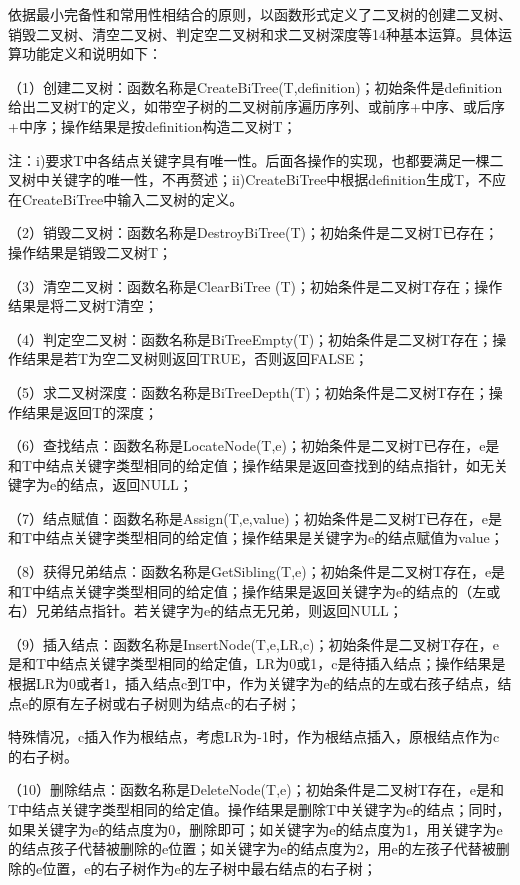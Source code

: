 \documentclass[supercite]{Experimental_Report}
\theoremstyle{definition}
\begin{document}
依据最小完备性和常用性相结合的原则，以函数形式定义了二叉树的创建二叉树、销毁二叉树、清空二叉树、判定空二叉树和求二叉树深度等14种基本运算。具体运算功能定义和说明如下：

（1）创建二叉树：函数名称是CreateBiTree(T,definition)；初始条件是definition 给出二叉树T的定义，如带空子树的二叉树前序遍历序列、或前序+中序、或后序+中序；操作结果是按definition构造二叉树T；

注：i)要求T中各结点关键字具有唯一性。后面各操作的实现，也都要满足一棵二叉树中关键字的唯一性，不再赘述；ii)CreateBiTree中根据definition生成T，不应在CreateBiTree中输入二叉树的定义。

（2）销毁二叉树：函数名称是DestroyBiTree(T)；初始条件是二叉树T已存在；操作结果是销毁二叉树T；

（3）清空二叉树：函数名称是ClearBiTree (T)；初始条件是二叉树T存在；操作结果是将二叉树T清空；

（4）判定空二叉树：函数名称是BiTreeEmpty(T)；初始条件是二叉树T存在；操作结果是若T为空二叉树则返回TRUE，否则返回FALSE；

（5）求二叉树深度：函数名称是BiTreeDepth(T)；初始条件是二叉树T存在；操作结果是返回T的深度；

（6）查找结点：函数名称是LocateNode(T,e)；初始条件是二叉树T已存在，e是和T中结点关键字类型相同的给定值；操作结果是返回查找到的结点指针，如无关键字为e的结点，返回NULL；

（7）结点赋值：函数名称是Assign(T,e,value)；初始条件是二叉树T已存在，e是和T中结点关键字类型相同的给定值；操作结果是关键字为e的结点赋值为value；

（8）获得兄弟结点：函数名称是GetSibling(T,e)；初始条件是二叉树T存在，e是和T中结点关键字类型相同的给定值；操作结果是返回关键字为e的结点的（左或右）兄弟结点指针。若关键字为e的结点无兄弟，则返回NULL；

（9）插入结点：函数名称是InsertNode(T,e,LR,c)；初始条件是二叉树T存在，e是和T中结点关键字类型相同的给定值，LR为0或1，c是待插入结点；操作结果是根据LR为0或者1，插入结点c到T中，作为关键字为e的结点的左或右孩子结点，结点e的原有左子树或右子树则为结点c的右子树；

特殊情况，c插入作为根结点，考虑LR为-1时，作为根结点插入，原根结点作为c的右子树。

（10）删除结点：函数名称是DeleteNode(T,e)；初始条件是二叉树T存在，e是和T中结点关键字类型相同的给定值。操作结果是删除T中关键字为e的结点；同时，如果关键字为e的结点度为0，删除即可；如关键字为e的结点度为1，用关键字为e的结点孩子代替被删除的e位置；如关键字为e的结点度为2，用e的左孩子代替被删除的e位置，e的右子树作为e的左子树中最右结点的右子树；
\end{document}
